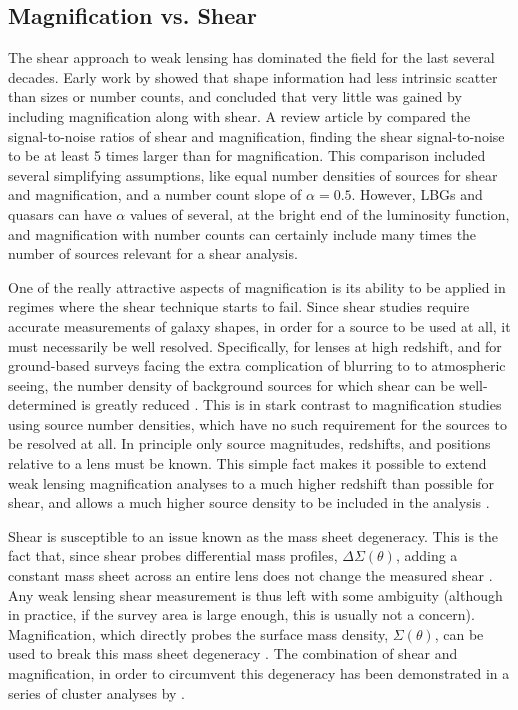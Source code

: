 \subsection{Magnification vs. Shear}
\label{sec:VS}

The shear approach to weak lensing has dominated the field for the last several decades. Early work by \citet{Schneider00} showed that shape information had less intrinsic scatter than sizes or number counts, and concluded that very little was gained by including magnification along with shear. A review article by \citet{BS01} compared the signal-to-noise ratios of shear and magnification, finding the shear signal-to-noise to be at least 5 times larger than for magnification. This comparison included several simplifying assumptions, like equal number densities of sources for shear and magnification, and a number count slope of $\alpha=0.5$. However, \ac{LBG}s and quasars can have $\alpha$ values of several, at the bright end of the luminosity function, and magnification with number counts can certainly include many times the number of sources relevant for a shear analysis.

One of the really attractive aspects of magnification is its ability to be applied in regimes where the shear technique starts to fail. Since shear studies require accurate measurements of galaxy shapes, in order for a source to be used at all, it must necessarily be well resolved. Specifically, for lenses at high redshift, and for ground-based surveys facing the extra complication of blurring to to atmospheric seeing, the number density of background sources for which shear can be well-determined is greatly reduced \citep{Waerbeke10}.  This is in stark contrast to magnification studies using source number densities, which have no such requirement for the sources to be resolved at all.  In principle only source magnitudes, redshifts, and positions relative to a lens must be known.  This simple fact makes it possible to extend weak lensing magnification analyses to a much higher redshift than possible for shear, and allows a much higher source density to be included in the analysis \citep{LHJM10}.  

Shear is susceptible to an issue known as the mass sheet degeneracy. This is the fact that, since shear probes differential mass profiles, $\Delta\Sigma(\theta)$, adding a constant mass sheet across an entire lens does not change the measured shear \citep{Falco85,SchneiderSeitz95}. Any weak lensing shear measurement is thus left with some ambiguity (although in practice, if the survey area is large enough, this is usually not a concern). Magnification, which directly probes the surface mass density, $\Sigma(\theta)$, can be used to break this mass sheet degeneracy \citep{Broadhurst95}. The combination of shear and magnification, in order to circumvent this degeneracy has been demonstrated in a series of cluster analyses by \citet{Umetsu11,Umetsu13,Umetsu14}.

